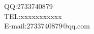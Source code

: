 \documentclass{ctexart}
\begin{document}
\begin{flushleft}
QQ:2733740879\\
TEL:xxxxxxxxxxx\\
E-mail:2733740879@qq.com\\

\end{flushleft}
\end{document}
